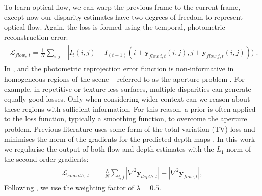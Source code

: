 
To learn optical flow, we can warp the previous frame to the current frame, except now our disparity estimates have two-degrees of freedom to represent optical flow. Again, the loss is formed using the temporal, photometric reconstruction error:
\begin{align}
\begin{split}
\mathcal{L}_{flow,~t} = \frac{1}{N} \sum_{i,j}& | I_t(i,j) - I_{(t-1)}(i+\mathbf{y}_{flow~i,t}(i,j),j+\mathbf{y}_{flow~j,t}(i,j))) |.
\label{eqn:flow}
\end{split}
\end{align}
In ,  and  the photometric reprojection error function is non-informative in homogeneous regions of the scene -- referred to as the aperture problem \cite{hartley2003multiple}. For example, in repetitive or texture-less surfaces, multiple disparities can generate equally good losses. Only when considering wider context can we reason about these regions with sufficient information. For this reason, a prior is often applied to the loss function, typically a smoothing function, to overcome the aperture problem. Previous literature uses some form of the total variation (TV) loss \cite{rudin1992nonlinear} and minimises the norm of the gradients for the predicted depth maps \cite{garg2016unsupervised,zhou2017unsupervised}. In this work we regularise the output of both flow and depth estimates with the $L_1$ norm of the second order gradients:
\begin{align}
\begin{split}
\mathcal{L}_{smooth,~t} =& \frac{\lambda}{N} \sum_{i,j}  | \nabla^2 \mathbf{y}_{depth,t} | + | \nabla^2 \mathbf{y}_{flow,t} |,
\end{split}
\label{eqn:smoothing}
\end{align}
Following \cite{zhou2017unsupervised}, we use the weighting factor of $\lambda = 0.5$.

